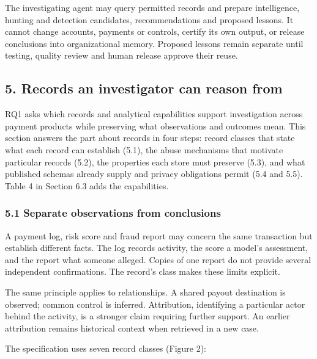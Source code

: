 \documentclass[
  11pt,
]{article}
\begin{document}
The investigating agent may query permitted records and prepare
intelligence, hunting and detection candidates, recommendations and
proposed lessons. It cannot change accounts, payments or controls,
certify its own output, or release conclusions into organizational
memory. Proposed lessons remain separate until testing, quality review
and human release approve their reuse.

\FloatBarrier

\hypertarget{records-an-investigator-can-reason-from}{%
\subsection{5. Records an investigator can reason
from}\label{records-an-investigator-can-reason-from}}

\suppressfloats[t]

RQ1 asks which records and analytical capabilities support investigation
across payment products while preserving what observations and outcomes
mean. This section answers the part about records in four steps: record
classes that state what each record can establish (5.1), the abuse
mechanisms that motivate particular records (5.2), the properties each
store must preserve (5.3), and what published schemas already supply and
privacy obligations permit (5.4 and 5.5). Table 4 in Section 6.3 adds
the capabilities.

\hypertarget{separate-observations-from-conclusions}{%
\subsubsection{5.1 Separate observations from
conclusions}\label{separate-observations-from-conclusions}}

A payment log, risk score and fraud report may concern the same
transaction but establish different facts. The log records activity, the
score a model's assessment, and the report what someone alleged. Copies
of one report do not provide several independent confirmations. The
record's class makes these limits explicit.

The same principle applies to relationships. A shared payout destination
is observed; common control is inferred. Attribution, identifying a
particular actor behind the activity, is a stronger claim requiring
further support. An earlier attribution remains historical context when
retrieved in a new case.

The specification uses seven record classes (Figure 2):
\end{document}
